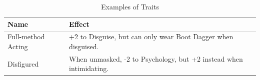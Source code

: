 \begin{table}[h!tbp]
	\begin{center}
		\begin{tabular}{p{4cm}p{12cm}} \toprule
			
		    \textbf{Name} & \textbf{Effect} \\ \midrule

		    Full-method Acting & +2 to Disguise, but can only wear Boot Dagger when disguised. \\[2mm] 

            Disfigured & When unmasked, -2 to Psychology, but +2 instead when intimidating. \\[2mm] 

		    \bottomrule
		\end{tabular}
	\end{center}
	\caption{Examples of Traits}
  \label{traits_example_table}
\end{table}
